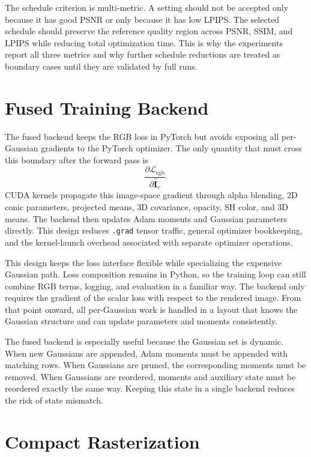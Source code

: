 The schedule criterion is multi-metric. A setting should not be accepted only because it has good PSNR or only because it has low LPIPS. The selected schedule should preserve the reference quality region across PSNR, SSIM, and LPIPS while reducing total optimization time. This is why the experiments report all three metrics and why further schedule reductions are treated as boundary cases until they are validated by full runs.

\section{Fused Training Backend}

The fused backend keeps the RGB loss in PyTorch but avoids exposing all per-Gaussian gradients to the PyTorch optimizer. The only quantity that must cross this boundary after the forward pass is
\begin{equation}
\frac{\partial\mathcal{L}_{\mathrm{rgb}}}{\partial\hat{\mathbf{I}}_v}.
\end{equation}
CUDA kernels propagate this image-space gradient through alpha blending, 2D conic parameters, projected means, 3D covariance, opacity, SH color, and 3D means. The backend then updates Adam moments and Gaussian parameters directly. This design reduces \texttt{.grad} tensor traffic, general optimizer bookkeeping, and the kernel-launch overhead associated with separate optimizer operations.

This design keeps the loss interface flexible while specializing the expensive Gaussian path. Loss composition remains in Python, so the training loop can still combine RGB terms, logging, and evaluation in a familiar way. The backend only requires the gradient of the scalar loss with respect to the rendered image. From that point onward, all per-Gaussian work is handled in a layout that knows the Gaussian structure and can update parameters and moments consistently.

The fused backend is especially useful because the Gaussian set is dynamic. When new Gaussians are appended, Adam moments must be appended with matching rows. When Gaussians are pruned, the corresponding moments must be removed. When Gaussians are reordered, moments and auxiliary state must be reordered exactly the same way. Keeping this state in a single backend reduces the risk of state mismatch.

\section{Compact Rasterization}


